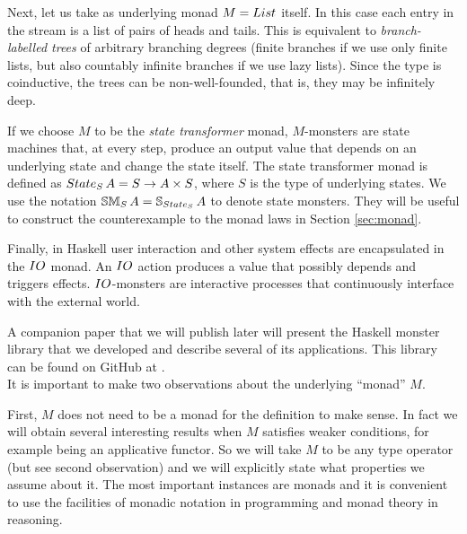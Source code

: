 \begin{example}
Next, let us take as underlying monad $M = \lstsym $ itself.
In this case each entry in the stream is a list of pairs of heads and tails.
This is equivalent to {\em branch-labelled trees} of arbitrary branching degrees (finite branches if we use only finite lists, but also countably infinite branches if we use lazy lists).
Since the type is coinductive, the trees can be non-well-founded, that is, they may be infinitely deep.
\end{example}

\begin{example}
If we choose $M$ to be the {\em state transformer} monad, $M$-monsters are state machines that, at every step, produce an output value that depends on an underlying state and change the state itself.
The state transformer monad is defined as $\state_S\,A = S\rightarrow A\times S$, where $S$ is the type of underlying states.
We use the notation $\stmon{S}\,A = \stream{\state_S}\,A$ to denote state monsters.
They will be useful to construct the counterexample to the monad laws in Section \ref{sec:monad}.
\end{example}

\begin{example}
Finally, in Haskell user interaction and other system effects are encapsulated in the $\io$ monad. An $\io$ action produces a value that possibly depends and triggers effects. $\io$-monsters are interactive processes that continuously interface with the external world.
\end{example}

A companion paper that we will publish later will present the Haskell monster library that we developed and describe several of its applications. This library can be found on GitHub at \repourl. \\

It is important to make two observations about the underlying ``monad'' $M$.

First, $M$ does not need to be a monad for the definition to make sense. 
In fact we will obtain several interesting results when $M$ satisfies weaker conditions, for example being an applicative functor.
So we will take $M$ to be any type operator (but see second observation) and we will explicitly state what properties we assume about it.
The most important instances are monads and it is convenient to use the facilities of monadic notation in programming and monad theory in reasoning.

